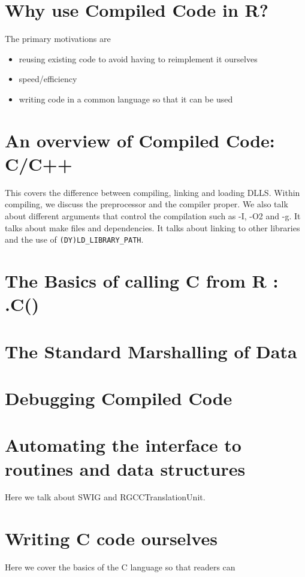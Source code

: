 \section{Why use Compiled Code in R?}
The primary motivations are 
\begin{itemize}
\item  reusing existing code to avoid having to reimplement it
ourselves
\item speed/efficiency
\item writing code in a common language so that it can be used 
\end{itemize}

\section{An overview of Compiled Code: C/C++}
This covers the difference between
compiling, linking and loading DLLS.
Within compiling, we discuss the preprocessor and the compiler proper.
We also talk about different arguments that control the compilation
such as -I, -O2 and -g.
It talks about make files and dependencies.
It talks about linking to other libraries and the use of \verb+(DY)LD_LIBRARY_PATH+.

\section{The Basics of calling C from R : .C()}


\section{The Standard Marshalling of Data}


\section{Debugging Compiled Code}

\section{Automating the interface to routines and data structures}
Here we talk about SWIG and RGCCTranslationUnit.

\section{Writing C code ourselves}
Here we cover the basics of the C language so that 
readers can 

